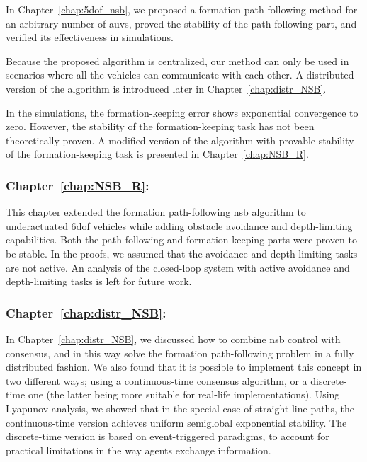 In Chapter~\ref{chap:5dof_nsb}, we proposed a formation path-following method for an arbitrary number of \glspl{auv}, proved the stability of the path following part, and verified its effectiveness in simulations.

Because the proposed algorithm is centralized, our method can only be used in scenarios where all the vehicles can communicate with each other.
A distributed version of the algorithm is introduced later in Chapter~\ref{chap:distr_NSB}.

In the simulations, the formation-keeping error shows exponential convergence to zero.
However, the stability of the formation-keeping task has not been theoretically proven.
A modified version of the algorithm with provable stability of the formation-keeping task is presented in Chapter~\ref{chap:NSB_R}.

\subsubsection{Chapter~\ref{chap:NSB_R}: }

This chapter extended the formation path-following \gls{nsb} algorithm to underactuated 6\gls{dof} vehicles while adding obstacle avoidance and depth-limiting capabilities. 
Both the path-following and formation-keeping parts were proven to be stable.     
In the proofs, we assumed that the avoidance and depth-limiting tasks are not active.
An analysis of the closed-loop system with active avoidance and depth-limiting tasks is left for future work.

\subsubsection{Chapter~\ref{chap:distr_NSB}: }

In Chapter~\ref{chap:distr_NSB}, we discussed how to combine \acrlong{nsb} control with consensus, and in this way solve the formation path-following problem in a fully distributed fashion. We also found that it is possible to implement this concept in two different ways; using a continuous-time consensus algorithm, or a discrete-time one (the latter being more suitable for real-life implementations).
Using Lyapunov analysis, we showed that in the special case of straight-line paths, the continuous-time version achieves uniform semiglobal exponential stability.
The discrete-time version is based on event-triggered paradigms, to account for practical limitations in the way agents exchange information.


